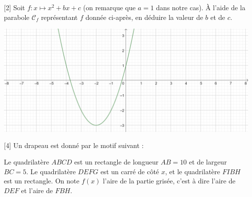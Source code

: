 \documentclass{exam}
\begin{document}
\begin{questions}
\vspace*{0.5cm}
[2]
Soit $f \colon x \mapsto x^2 + bx + c$ (on remarque que $a = 1$ dans notre cas). À l'aide de la parabole $\mathcal{C}_f$ représentant $f$ donnée ci-après, en déduire la valeur de $b$ et de $c$.
\begin{center}
\includegraphics[width=\textwidth]{Parabole.png}
\end{center}
\newpage
{}[4]
Un drapeau est donné par le motif suivant :
\begin{center}
\end{center}
Le quadrilatère $ABCD$ est un rectangle de longueur $AB = 10$ et de largeur $BC = 5$. Le quadrilatère $DEFG$ est un carré de côté $x$, et le quadrilatère $FIBH$ est un rectangle. On note $f(x)$ l'aire de la partie grisée, c'est à dire l'aire de $DEF$ et l'aire de $FBH$.
\begin{parts}

\end{parts}
\end{questions}
\end{document}
